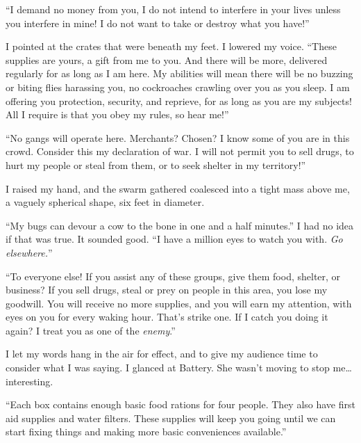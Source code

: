 ``I demand no money from you, I do not intend to interfere in your lives unless you interfere in mine!  I do not want to take or destroy what you have!''



I pointed at the crates that were beneath my feet.  I lowered my voice.  ``These supplies are yours, a gift from me to you.  And there will be more, delivered regularly for as long as I am here.  My abilities will mean there will be no buzzing or biting flies harassing you, no cockroaches crawling over you as you sleep.  I am offering you protection, security, and reprieve, for as long as you are my subjects!  All I require is that you obey my rules, so hear me!''



``No gangs will operate here.  Merchants?  Chosen?  I know some of you are in this crowd.  Consider this my declaration of war.  I will not permit you to sell drugs, to hurt my people or steal from them, or to seek shelter in my territory!''



I raised my hand, and the swarm gathered coalesced into a tight mass above me, a vaguely spherical shape, six feet in diameter.



``My bugs can devour a cow to the bone in one and a half minutes.''  I had no idea if that was true.  It sounded good.  ``I have a million eyes to watch you with.  \emph{Go elsewhere.}''



``To everyone else!  If you assist any of these groups, give them food, shelter, or business?  If you sell drugs, steal or prey on people in this area, you lose my goodwill.  You will receive no more supplies, and you will earn my attention, with eyes on you for every waking hour.  That's strike one.  If I catch you doing it again?  I treat you as one of the \emph{enemy}.''



I let my words hang in the air for effect, and to give my audience time to consider what I was saying.  I glanced at Battery.  She wasn't moving to stop me\ldots interesting.



``Each box contains enough basic food rations for four people.  They also have first aid supplies and water filters.  These supplies will keep you going until we can start fixing things and making more basic conveniences available.''




